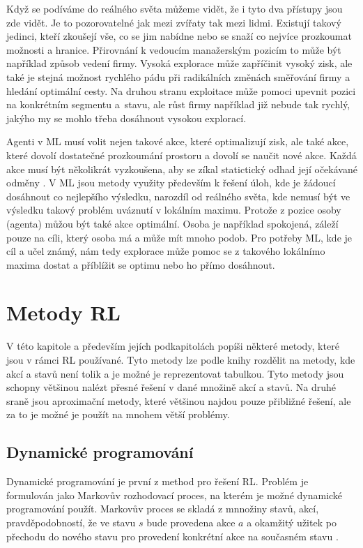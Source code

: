 \documentclass{article}
\begin{document}
Když se podíváme do reálného světa můžeme vidět, že i tyto dva přístupy jsou zde vidět. Je to pozorovatelné jak mezi zvířaty tak mezi lidmi. Existují takový jedinci, kteří zkoušejí vše, co se jim nabídne nebo se snaží co nejvíce prozkoumat možnosti a hranice. Přirovnání k vedoucím manažerským pozicím to může být například způsob vedení firmy. Vysoká explorace může zapříčinit vysoký zisk, ale také je stejná možnost rychlého pádu při radikálních změnách směřování firmy a hledání optimální cesty. Na druhou stranu exploitace může pomoci upevnit pozici na konkrétním segmentu a~stavu, ale růst firmy například již nebude tak rychlý, jakýho my se mohlo třeba dosáhnout vysokou explorací.

Agenti v ML musí volit nejen takové akce, které optimalizují zisk, ale také akce, které dovolí dostatečné prozkoumání prostoru a dovolí se naučit nové akce. Každá akce musí být několikrát vyzkoušena, aby se zíkal statictický odhad její očekávané odměny \cite{sutton1998introduction}. V ML jsou metody využity především k řešení úloh, kde je žádoucí dosáhnout co nejlepšího výsledku, narozdíl od reálného světa, kde nemusí být ve výsledku takový problém uváznutí v lokálním maximu. Protože z pozice osoby (agenta) můžou být také akce optimální. Osoba je například spokojená, záleží pouze na cíli, který osoba má a může mít mnoho podob. Pro potřeby ML, kde je cíl a učel známý, nám tedy explorace může pomoc se z takového lokálnímo maxima dostat a příblížit se optimu nebo ho přímo dosáhnout. 


\section{Metody RL}
V této kapitole a především jejích podkapitolách popíši některé metody, které jsou v rámci RL používané. Tyto metody lze podle knihy \cite{sutton1998introduction} rozdělit na metody, kde akcí a stavů není tolik a je možné je reprezentovat tabulkou. Tyto metody jsou schopny většinou nalézt přesné řešení v dané množině akcí a stavů. Na druhé sraně jsou aproximační metody, které většinou najdou pouze přibližné řešení, ale za to je možné je použít na mnohem větší problémy. 


\subsection{Dynamické programování}
Dynamické programování je první z method pro řešení RL. Problém je formulován jako Markovův rozhodovací proces, na kterém je možné dynamické programování použít. Markovův proces se skladá z mnnožiny stavů, akcí, pravděpodobností, že ve stavu $s$ bude provedena akce $a$ a okamžitý užitek po přechodu do nového stavu pro provedení konkrétní akce na současném stavu \cite{sutton1998introduction}. 
\end{document}
